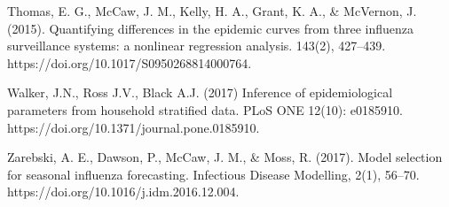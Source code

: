 \begin{thebibliography}{99}
	 Thomas, E. G., McCaw, J. M., Kelly, H. A., Grant, K. A., \& McVernon, J. (2015). Quantifying differences in the epidemic curves from three influenza surveillance systems: a nonlinear regression analysis. 143(2), 427–439. https://doi.org/10.1017/S0950268814000764.
	
	 Walker, J.N., Ross J.V., Black A.J. (2017) Inference of epidemiological parameters from household stratified data. PLoS ONE 12(10): e0185910. https://doi.org/10.1371/journal.pone.0185910.
	
	 Zarebski, A. E., Dawson, P., McCaw, J. M., \& Moss, R. (2017). Model selection for seasonal influenza forecasting. Infectious Disease Modelling, 2(1), 56–70. https://doi.org/10.1016/j.idm.2016.12.004.
	
	
	
\end{thebibliography}